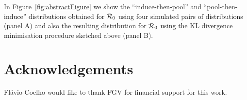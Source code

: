 \documentclass[11pt]{article}
\begin{document}
In Figure~\ref{fig:abstractFigure} we show the ``induce-then-pool'' and ``pool-then-induce'' distributions obtained for ${\cal R}_0$ using four simulated pairs of distributions (panel A) and also the resulting distribution for ${\cal R}_0$ using the KL divergence minimisation procedure sketched above (panel B).

\section*{Acknowledgements}
Fl\'avio Coelho would like to thank FGV for financial support for this work.


\end{document}
